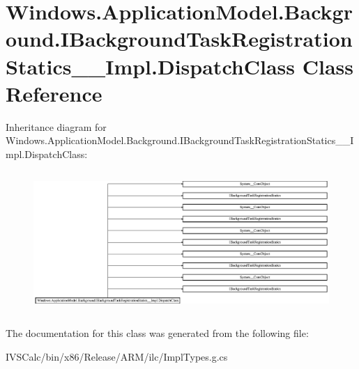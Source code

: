 \hypertarget{class_windows_1_1_application_model_1_1_background_1_1_i_background_task_registration_statics_____impl_1_1_dispatch_class}{}\section{Windows.\+Application\+Model.\+Background.\+I\+Background\+Task\+Registration\+Statics\+\_\+\+\_\+\+Impl.\+Dispatch\+Class Class Reference}
\label{class_windows_1_1_application_model_1_1_background_1_1_i_background_task_registration_statics_____impl_1_1_dispatch_class}
Inheritance diagram for Windows.\+Application\+Model.\+Background.\+I\+Background\+Task\+Registration\+Statics\+\_\+\+\_\+\+Impl.\+Dispatch\+Class\+:\begin{figure}[H]
\begin{center}
\leavevmode
\includegraphics[height=5.422535cm]{class_windows_1_1_application_model_1_1_background_1_1_i_background_task_registration_statics_____impl_1_1_dispatch_class}
\end{center}
\end{figure}


The documentation for this class was generated from the following file\+:\begin{DoxyCompactItemize}
\item 
I\+V\+S\+Calc/bin/x86/\+Release/\+A\+R\+M/ilc/Impl\+Types.\+g.\+cs\end{DoxyCompactItemize}
